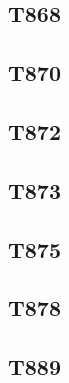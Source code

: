 \subsection{T868}

\subsection{T870}

\subsection{T872}

\subsection{T873}

\subsection{T875}

\subsection{T878}

\subsection{T889}


